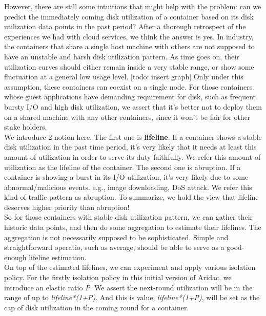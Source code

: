 \documentclass[10pt, conference,compsoc]{IEEEtran}
\begin{document}
However, there are still some intuitions that might help with the problem: can we predict the immediately coming disk utilization of a container based on its disk utilization data points in the past period? After a thorough retrospect of the experiences we had with cloud services, we think the answer is yes. In industry, the containers that share a single host machine with others are not supposed to have an unstable and harsh disk utilization  pattern. As time goes on, their utilization curves should either remain inside a very stable range, or show some fluctuation at a general low usage level. [todo: insert graph] Only under this assumption, these containers can coexist on a single node. For those containers whose guest applications have demanding requirement for disk, such as frequent bursty I/O and high disk utilization, we assert that it's better not to deploy them on a shared machine with any other containers, since it won't be fair for other stake holders. \\

We introduce 2 notion here. The first one is \textbf{lifeline}. If a container shows a stable disk utilization in the past time period, it’s very likely that it needs at least this amount of utilization in order to serve its duty faithfully. We refer this amount of utilization as the lifeline of the container. The second one is abruption. If a container is showing a burst in its I/O utilization, it's very likely due to some abnormal/malicious events. e.g., image downloading, DoS attack. We refer this kind of traffic pattern as abruption. To summarize, we hold the view that lifeline deserves higher priority than abruption! \\

So for those containers with stable disk utilization pattern, we can gather  their historic data points, and then do some aggregation to estimate their lifelines. The aggregation is not necessarily supposed to be sophisticated. Simple and straightforward operatio, such as average, should be able to serve as a good-enough lifeline estimation. \\

On top of the estimated lifelines, we can experiment and apply various isolation policy. For the firstly isolation policy in this initial version of Aridac, we introduce an elastic ratio \textit{P}. We assert the next-round utilization will be in the range of up to \textit{lifeline*(1+P)}. And this is value, \textit{lifeline*(1+P)}, will be set as the cap of disk utilization in the coming round for a container.\\
\end{document}
